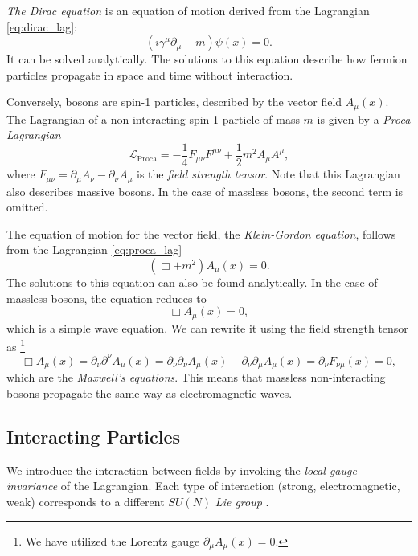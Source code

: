 \emph{The Dirac equation} is an equation of motion derived from the Lagrangian \cref{eq:dirac_lag}:
\begin{equation}
    \label{eq:dirac}
    \left( i \gamma^\mu \partial_\mu - m \right) \psi(x) = 0.
\end{equation}
It can be solved analytically.
The solutions to this equation describe how fermion particles propagate in space and time without interaction. 

Conversely, bosons are spin-1 particles, described by the vector field $A_\mu(x)$.
The Lagrangian of a non-interacting spin-1 particle of mass $m$ is given by a \emph{Proca Lagrangian}
\begin{equation}
    \label{eq:proca_lag}
    \mathcal{L}_{\text{Proca}} = - \frac{1}{4} F_{\mu\nu} F^{\mu\nu} + \frac{1}{2} m^2 A_\mu A^\mu,
\end{equation}
where $F_{\mu\nu} = \partial_\mu A_\nu - \partial_\nu A_\mu$ is the \emph{field strength tensor}.
Note that this Lagrangian also describes massive bosons. 
In the case of massless bosons, the second term is omitted.

The equation of motion for the vector field, the \emph{Klein-Gordon equation}, follows from the Lagrangian \cref{eq:proca_lag}
\begin{equation}
    \label{eq:klein_gordon}
    \left( \Box + m^2 \right) A_\mu(x) = 0.
\end{equation}
The solutions to this equation can also be found analytically.
In the case of massless bosons, the equation reduces to 
\begin{equation}
    \label{eq:wave_eq}
    \Box A_\mu(x) = 0,
\end{equation}
which is a simple wave equation.
We can rewrite it using the field strength tensor as \footnote{We have utilized the Lorentz gauge $\partial_\mu A_\mu(x) = 0$.}
\begin{equation}
    \Box A_\mu(x) = \partial_\nu \partial^\nu A_\mu(x) = \partial_\nu \partial_\nu A_\mu(x) - \partial_\nu \partial_\mu A_\mu(x) =  \partial_\nu F_{\nu\mu}(x) =  0,
\end{equation}
which are the \emph{Maxwell's equations}. 
This means that massless non-interacting bosons propagate the same way as electromagnetic waves.



\subsection{Interacting Particles}
\label{sec:interacting_particles}
We introduce the interaction between fields by invoking the \emph{local gauge invariance} of the Lagrangian. 
Each type of interaction (strong, electromagnetic, weak) corresponds to a different $SU(N)$ \emph{Lie group} \cite{fecko}.

